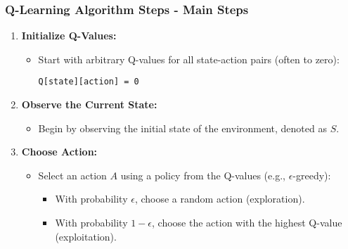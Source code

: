 \documentclass[aspectratio=169]{beamer}
\begin{document}
\begin{frame}[fragile]
    \frametitle{Q-Learning Algorithm Steps - Main Steps}
    \begin{enumerate}
        \item \textbf{Initialize Q-Values:}
        \begin{itemize}
            \item Start with arbitrary Q-values for all state-action pairs (often to zero):
            \begin{lstlisting}
Q[state][action] = 0
            \end{lstlisting}
        \end{itemize}

        \item \textbf{Observe the Current State:}
        \begin{itemize}
            \item Begin by observing the initial state of the environment, denoted as \(S\).
        \end{itemize}

        \item \textbf{Choose Action:}
        \begin{itemize}
            \item Select an action \(A\) using a policy from the Q-values (e.g., $\epsilon$-greedy):
            \begin{itemize}
                \item With probability $\epsilon$, choose a random action (exploration).
                \item With probability \(1-\epsilon\), choose the action with the highest Q-value (exploitation).
            \end{itemize}
        \end{itemize}
    \end{enumerate}
\end{frame}
\end{document}
